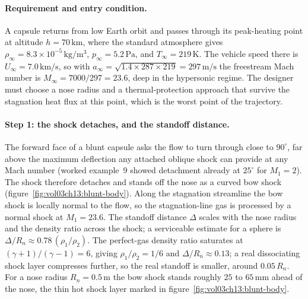 \paragraph{Requirement and entry condition.} A capsule returns from
low Earth orbit and passes through its peak-heating point at altitude
$h = 70\,\si{\kilo\meter}$, where the standard atmosphere gives
$\rho_\infty = 8.3\times 10^{-5}\,\si{\kilogram\per\meter\cubed}$,
$p_\infty = 5.2\,\text{Pa}$, and $T_\infty = 219\,\si{\kelvin}$. The
vehicle speed there is $U_\infty = 7.0\,\si{\kilo\meter\per\second}$,
so with $a_\infty = \sqrt{1.4\times 287\times 219} = 297\,\si{\meter
\per\second}$ the freestream Mach number is
$M_\infty = 7000/297 = 23.6$, deep in the hypersonic regime. The
designer must choose a nose radius and a thermal-protection approach
that survive the stagnation heat flux at this point, which is the
worst point of the trajectory.

\paragraph{Step 1: the shock detaches, and the standoff distance.} The
forward face of a blunt capsule asks the flow to turn through close to
$90^{\circ}$, far above the maximum deflection any attached oblique
shock can provide at any Mach number (worked example~9 showed
detachment already at $25^{\circ}$ for $M_1 = 2$). The shock therefore
detaches and stands off the nose as a curved bow shock
(figure~\ref{fig:vol03ch13:blunt-body}). Along the stagnation
streamline the bow shock is locally normal to the flow, so the
stagnation-line gas is processed by a normal shock at $M_1 = 23.6$. The
standoff distance $\Delta$ scales with the nose radius and the
density ratio across the shock; a serviceable estimate for a sphere is
$\Delta/R_n \approx 0.78\,(\rho_1/\rho_2)$. The perfect-gas density
ratio saturates at $(\gamma + 1)/(\gamma - 1) = 6$, giving
$\rho_1/\rho_2 = 1/6$ and $\Delta/R_n \approx 0.13$; a real
dissociating shock layer compresses further, so the real standoff is
smaller, around $0.05\,R_n$. For a nose radius $R_n = 0.5\,\si{\meter}$
the bow shock stands roughly $25$ to $65\,\si{\milli\meter}$ ahead of
the nose, the thin hot shock layer marked in
figure~\ref{fig:vol03ch13:blunt-body}.

